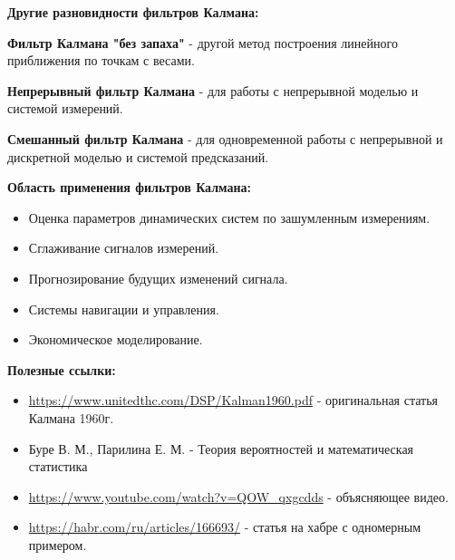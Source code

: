 \documentclass[12pt, a4paper]{article}
\begin{document}
\newpage
\begin{flushleft}
\textbf{Другие разновидности фильтров Калмана:}
\end{flushleft}

\textbf{Фильтр Калмана "без запаха"} - другой метод построения линейного приближения по точкам с весами.

\textbf{Непрерывный фильтр Калмана} - для работы с непрерывной моделью и системой измерений.

\textbf{Смешанный фильтр Калмана} - для одновременной работы с непрерывной и дискретной моделью и системой предсказаний.

\begin{flushleft}
\textbf{Область применения фильтров Калмана:}
\end{flushleft}

\begin{itemize}
\item Оценка параметров динамических систем по зашумленным измерениям.
\item Сглаживание сигналов измерений.
\item Прогнозирование будущих изменений сигнала.
\item Системы навигации и управления.
\item Экономическое моделирование.
\end{itemize}

\begin{flushleft}
\textbf{Полезные ссылки:}
\end{flushleft}

\begin{itemize}
\item \url{https://www.unitedthc.com/DSP/Kalman1960.pdf} - оригинальная статья Калмана 1960г.
\item Буре В. М., Парилина Е. М. - Теория вероятностей и математическая статистика
\item \url{https://www.youtube.com/watch?v=QOW_qxgcdds} - объясняющее видео.
\item \url{https://habr.com/ru/articles/166693/} - статья на хабре с одномерным примером.
\end{itemize}
\end{document}
